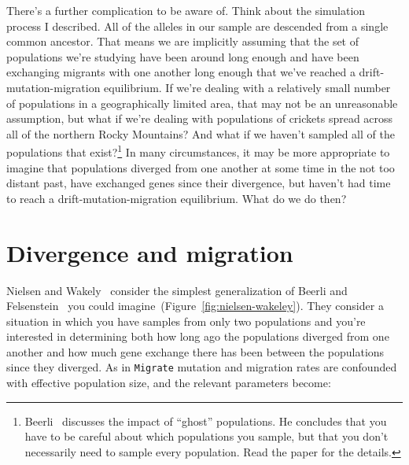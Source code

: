 \documentclass[12pt]{article}
\begin{document}
There's a further complication to be aware of. Think about the
simulation process I described. All of the alleles in our sample are
descended from a single common ancestor. That means we are implicitly
assuming that the set of populations we're studying have been around
long enough and have been exchanging migrants with one another long
enough that we've reached a drift-mutation-migration equilibrium. If
we're dealing with a relatively small number of populations in a
geographically limited area, that may not be an unreasonable
assumption, but what if we're dealing with populations of crickets
spread across all of the northern Rocky Mountains? And what if we
haven't sampled all of the populations that
exist?\footnote{Beerli~\cite{Beerli-2004} discusses the impact of
  ``ghost'' populations. He concludes that you have to be careful
  about which populations you sample, but that you don't necessarily
  need to sample every population. Read the paper for the details.} In
many circumstances, it may be more appropriate to imagine that
populations diverged from one another at some time in the not too
distant past, have exchanged genes since their divergence, but haven't
had time to reach a drift-mutation-migration equilibrium. What do we
do then?

\section*{Divergence and migration}

Nielsen and Wakely~\cite{Nielsen-Wakeley-2001} consider the simplest
generalization of Beerli and
Felsenstein~\cite{Beerli-Felsenstein-1999,Beerli-Felsenstein-2001} you
could imagine~(Figure~\ref{fig:nielsen-wakeley}). They consider a
situation in which you have samples from only two populations and
you're interested in determining both how long ago the populations
diverged from one another and how much gene exchange there has been
between the populations since they diverged. As in {\tt Migrate}
mutation and migration rates are confounded with effective population
size, and the relevant parameters become:
\end{document}
